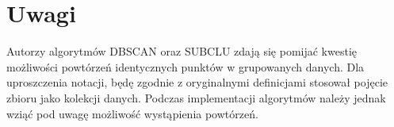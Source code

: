 \section{Uwagi}
Autorzy algorytmów DBSCAN oraz SUBCLU zdają się pomijać kwestię możliwości powtórzeń identycznych punktów w grupowanych danych. Dla uproszczenia notacji, będę zgodnie z oryginalnymi definicjami stosował pojęcie zbioru jako kolekcji danych. Podczas implementacji algorytmów należy jednak wziąć pod uwagę możliwość wystąpienia powtórzeń.
